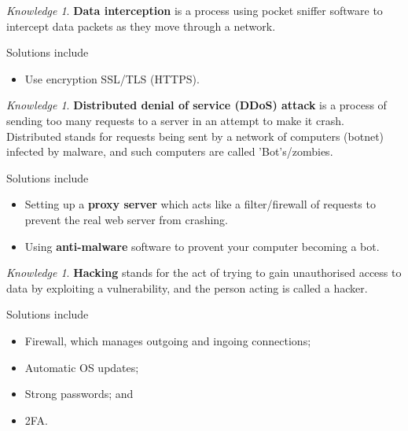\documentclass[8pt]{article}
\theoremstyle{remark}
\newtheorem{knowledge}[method]{Knowledge}
\begin{document}
            \begin{knowledge}
                \textbf{Data interception} is a process using pocket sniffer software to intercept data packets as they move through a network.

                Solutions include
                \begin{itemize}
                    \item Use encryption SSL/TLS (HTTPS).
                \end{itemize}
            \end{knowledge}

            \begin{knowledge}
                \textbf{Distributed denial of service (DDoS) attack} is a process of sending too many requests to a server in an attempt to make it crash. Distributed stands for requests being sent by a network of computers (botnet) infected by malware, and such computers are called 'Bot's/zombies.

                Solutions include
                \begin{itemize}
                    \item Setting up a \textbf{proxy server} which acts like a filter/firewall of requests to prevent the real web server from crashing.
                    \item Using \textbf{anti-malware} software to provent your computer becoming a bot.
                \end{itemize}
            \end{knowledge}

            \begin{knowledge}
                \textbf{Hacking} stands for the act of trying to gain unauthorised access to data by exploiting a vulnerability, and the person acting is called a hacker.

                Solutions include
                \begin{itemize}
                    \item Firewall, which manages outgoing and ingoing connections;
                    \item Automatic OS updates;
                    \item Strong passwords; and
                    \item 2FA.
                \end{itemize}
            \end{knowledge}
\end{document}
